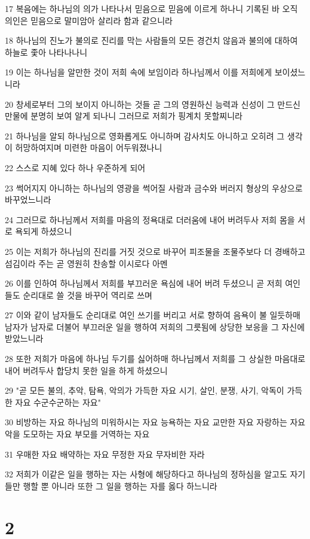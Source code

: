 \par 17 복음에는 하나님의 의가 나타나서 믿음으로 믿음에 이르게 하나니 기록된 바 오직 의인은 믿음으로 말미암아 살리라 함과 같으니라
\par 18 하나님의 진노가 불의로 진리를 막는 사람들의 모든 경건치 않음과 불의에 대하여 하늘로 좇아 나타나나니
\par 19 이는 하나님을 알만한 것이 저희 속에 보임이라 하나님께서 이를 저희에게 보이셨느니라
\par 20 창세로부터 그의 보이지 아니하는 것들 곧 그의 영원하신 능력과 신성이 그 만드신 만물에 분명히 보여 알게 되나니 그러므로 저희가 핑계치 못할찌니라
\par 21 하나님을 알되 하나님으로 영화롭게도 아니하며 감사치도 아니하고 오히려 그 생각이 허망하여지며 미련한 마음이 어두워졌나니
\par 22 스스로 지혜 있다 하나 우준하게 되어
\par 23 썩어지지 아니하는 하나님의 영광을 썩어질 사람과 금수와 버러지 형상의 우상으로 바꾸었느니라
\par 24 그러므로 하나님께서 저희를 마음의 정욕대로 더러움에 내어 버려두사 저희 몸을 서로 욕되게 하셨으니
\par 25 이는 저희가 하나님의 진리를 거짓 것으로 바꾸어 피조물을 조물주보다 더 경배하고 섬김이라 주는 곧 영원히 찬송할 이시로다 아멘
\par 26 이를 인하여 하나님께서 저희를 부끄러운 욕심에 내어 버려 두셨으니 곧 저희 여인들도 순리대로 쓸 것을 바꾸어 역리로 쓰며
\par 27 이와 같이 남자들도 순리대로 여인 쓰기를 버리고 서로 향하여 음욕이 불 일듯하매 남자가 남자로 더불어 부끄러운 일을 행하여 저희의 그릇됨에 상당한 보응을 그 자신에 받았느니라
\par 28 또한 저희가 마음에 하나님 두기를 싫어하매 하나님께서 저희를 그 상실한 마음대로 내어 버려두사 합당치 못한 일을 하게 하셨으니
\par 29 "곧 모든 불의, 추악, 탐욕, 악의가 가득한 자요 시기, 살인, 분쟁, 사기, 악독이 가득한 자요 수군수군하는 자요"
\par 30 비방하는 자요 하나님의 미워하시는 자요 능욕하는 자요 교만한 자요 자랑하는 자요 악을 도모하는 자요 부모를 거역하는 자요
\par 31 우매한 자요 배약하는 자요 무정한 자요 무자비한 자라
\par 32 저희가 이같은 일을 행하는 자는 사형에 해당하다고 하나님의 정하심을 알고도 자기들만 행할 뿐 아니라 또한 그 일을 행하는 자를 옳다 하느니라

\chapter{2}

